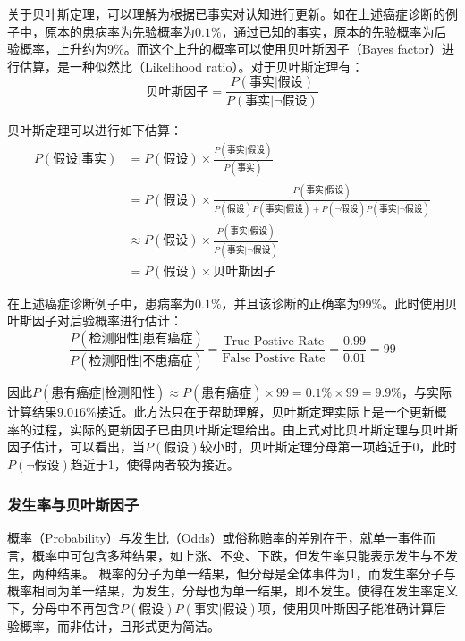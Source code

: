 \documentclass[11pt]{article}
\begin{document}
关于贝叶斯定理，可以理解为根据已事实对认知进行更新。如在上述癌症诊断的例子中，原本的患病率为先验概率为$0.1\%$，通过已知的事实，原本的先验概率为后验概率，上升约为$9\%$。而这个上升的概率可以使用贝叶斯因子（Bayes factor）进行估算，是一种似然比（Likelihood ratio）。对于贝叶斯定理有：
\begin{equation*}
    \text{贝叶斯因子} = \frac{P(\text{事实}|\text{假设})}{P(\text{事实}|\lnot \text{假设})}
\end{equation*}

贝叶斯定理可以进行如下估算：
\begin{align*}
    P(\text{假设}|\text{事实}) &= P(\text{假设})\times \frac{P(\text{事实}|\text{假设})}{P(\text{事实})} \\
    &= P(\text{假设}) \times \frac{P(\text{事实}|\text{假设})}{P(\text{假设})P(\text{事实}|\text{假设}) + P(\lnot \text{假设})P(\text{事实}|\lnot \text{假设})} \\
    &\approx P(\text{假设})\times \frac{P(\text{事实}|\text{假设})}{P(\text{事实}|\lnot \text{假设})} \\
    &= P(\text{假设})\times \text{贝叶斯因子}
\end{align*}

\begin{example}
    在上述癌症诊断例子中，患病率为$0.1\%$，并且该诊断的正确率为$99\%$。此时使用贝叶斯因子对后验概率进行估计：
    \begin{equation*}
        \frac{P(\text{检测阳性}|\text{患有癌症})}{P(\text{检测阳性}|\text{不患癌症})} = \frac{\text{True Postive Rate}}{\text{False Postive Rate}} = \frac{0.99}{0.01} = 99
    \end{equation*}

    因此$P(\text{患有癌症}|\text{检测阳性}) \approx P(\text{患有癌症}) \times 99 = 0.1\% \times 99 = 9.9\% $，与实际计算结果$9.016\%$接近。此方法只在于帮助理解，贝叶斯定理实际上是一个更新概率的过程，实际的更新因子已由贝叶斯定理给出。由上式对比贝叶斯定理与贝叶斯因子估计，可以看出，当$P(\text{假设})$较小时，贝叶斯定理分母第一项趋近于0，此时$P(\lnot \text{假设})$趋近于1，使得两者较为接近。
\end{example}

\subsubsection{发生率与贝叶斯因子}

概率（Probability）与发生比（Odds）或俗称赔率的差别在于，就单一事件而言，概率中可包含多种结果，如上涨、不变、下跌，但发生率只能表示发生与不发生，两种结果。
概率的分子为单一结果，但分母是全体事件为1，而发生率分子与概率相同为单一结果，为发生，分母也为单一结果，即不发生。使得在发生率定义下，分母中不再包含$P(\text{假设})P(\text{事实}|\text{假设})$项，使用贝叶斯因子能准确计算后验概率，而非估计，且形式更为简洁。
\end{document}

